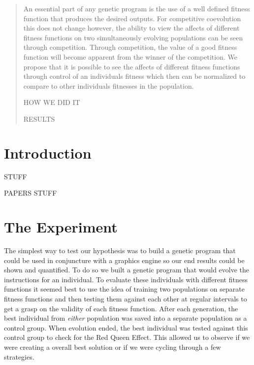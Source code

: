 \documentclass{acm_proc_article-sp}
\begin{document}
\maketitle
\begin{abstract}

An essential part of any genetic program is the use of a well defined fitness function that produces the desired outputs. For competitive coevolution this does not change however, the ability to view the affects of different fitness functions on two simultaneously evolving populations can be seen through competition. Through competition, the value of a good fitness function will become apparent from the winner of the competition. We propose that it is possible to see the affects of different fitness functions through control of an individuals fitness which then can be normalized to compare to other individuals fitnesses in the population.

HOW WE DID IT

RESULTS

\end{abstract}




\section{Introduction} %

STUFF

PAPERS STUFF

\section{The Experiment} %

The simplest way to test our hypothesis was to build a genetic program that could be used in conjuncture with a graphics engine so our end results could be shown and quantified. To do so we built a genetic program that would evolve the instructions for an individual. To evaluate these individuals with different fitness functions it seemed best to use the idea of training two populations on separate fitness functions and then testing them against each other at regular intervals to get a grasp on the validity of each fitness function. After each generation, the best individual from \textit{either} population was saved into a separate population as a control group. When evolution ended, the best individual was tested against this control group to check for the Red Queen Effect. This allowed us to observe if we were creating a overall best solution or if we were cycling through a few strategies.
\end{document}
